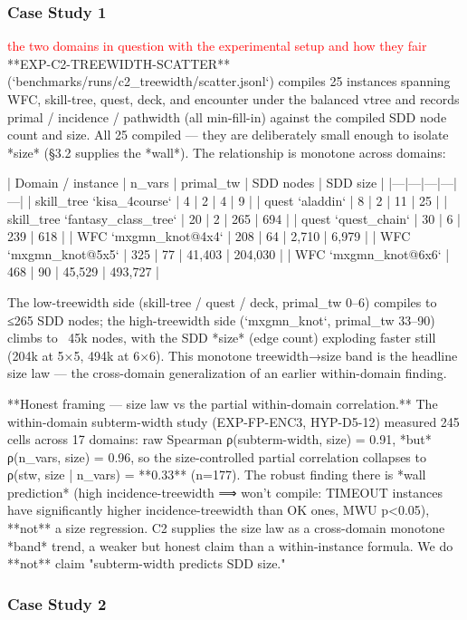 \documentclass[letterpaper]{article} %
\newcommand{\todo}[1]{\textcolor{red}{#1}}
\begin{document}
\subsubsection{Case Study 1}
\todo{the two domains in question with the experimental setup and how they fair}
**EXP-C2-TREEWIDTH-SCATTER** (`benchmarks/runs/c2_treewidth/scatter.jsonl`) compiles 25 instances
spanning WFC, skill-tree, quest, deck, and encounter under the balanced vtree and records primal /
incidence / pathwidth (all min-fill-in) against the compiled SDD node count and size. All 25 compiled
— they are deliberately small enough to isolate *size* (§3.2 supplies the *wall*). The relationship
is monotone across domains:

| Domain / instance | n_vars | primal_tw | SDD nodes | SDD size |
|---|---|---|---|---|
| skill_tree `kisa_4course` | 4 | 2 | 4 | 9 |
| quest `aladdin` | 8 | 2 | 11 | 25 |
| skill_tree `fantasy_class_tree` | 20 | 2 | 265 | 694 |
| quest `quest_chain` | 30 | 6 | 239 | 618 |
| WFC `mxgmn_knot@4x4` | 208 | 64 | 2,710 | 6,979 |
| WFC `mxgmn_knot@5x5` | 325 | 77 | 41,403 | 204,030 |
| WFC `mxgmn_knot@6x6` | 468 | 90 | 45,529 | 493,727 |

The low-treewidth side (skill-tree / quest / deck, primal_tw 0–6) compiles to ≤265 SDD nodes; the
high-treewidth side (`mxgmn_knot`, primal_tw 33–90) climbs to ~45k nodes, with the SDD *size* (edge
count) exploding faster still (204k at 5×5, 494k at 6×6). This monotone treewidth→size band is the
headline size law — the cross-domain generalization of an earlier within-domain finding.

**Honest framing — size law vs the partial within-domain correlation.** The within-domain
subterm-width study (EXP-FP-ENC3, HYP-D5-12) measured 245 cells across 17 domains: raw Spearman
ρ(subterm-width, size) = 0.91, *but* ρ(n_vars, size) = 0.96, so the size-controlled partial
correlation collapses to ρ(stw, size | n_vars) = **0.33** (n=177). The robust finding there is *wall
prediction* (high incidence-treewidth ⟹ won't compile: TIMEOUT instances have significantly higher
incidence-treewidth than OK ones, MWU p<0.05), **not** a size regression. C2 supplies the size law as
a cross-domain monotone *band* trend, a weaker but honest claim than a within-instance formula. We do
**not** claim "subterm-width predicts SDD size."

\subsubsection{Case Study 2}
\end{document}
